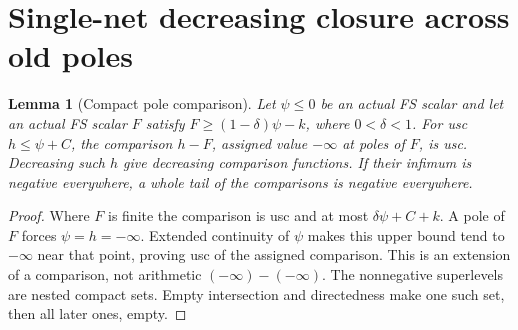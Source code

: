\documentclass[10pt]{article}
\newtheorem{lemma}[theorem]{Lemma}
\begin{document}
\section{Single-net decreasing closure across old poles}
\begin{lemma}[Compact pole comparison]\label{polecompare}
Let $\psi\leq0$ be an actual FS scalar and let an actual FS scalar
$F$ satisfy $F\geq(1-\delta)\psi-k$, where $0<\delta<1$.
For usc $h\leq\psi+C$, the comparison $h-F$, assigned value
$-\infty$ at poles of $F$, is usc. Decreasing such $h$ give decreasing
comparison functions. If their infimum is negative everywhere, a whole
tail of the comparisons is negative everywhere.
\end{lemma}
\begin{proof}
Where $F$ is finite the comparison is usc and at most
$\delta\psi+C+k$. A pole of $F$ forces $\psi=h=-\infty$.
Extended continuity of $\psi$ makes this upper bound tend to
$-\infty$ near that point, proving usc of the assigned comparison.
This is an extension of a comparison, not arithmetic
$(-\infty)-(-\infty)$. The nonnegative superlevels are nested compact
sets. Empty intersection and directedness make one such set, then
all later ones, empty.
\end{proof}
\end{document}
